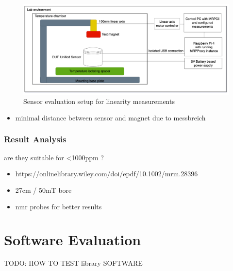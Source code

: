 \begin{figure}
\centering
\includegraphics{./generated_images/border_Sensor_evaluation_setup_for_linearity_measurements.png}
\caption{Sensor evaluation setup for linearity measurements
\label{Sensor_evaluation_setup_for_linearity_measurements.png}}
\end{figure}

\begin{itemize}
\tightlist
\item
  minimal distance between sensor and magnet due to messbreich
\end{itemize}

\hypertarget{result-analysis}{%
\subsubsection{Result Analysis}\label{result-analysis}}

are they suitable for \textless1000ppm ?

\begin{itemize}
\tightlist
\item
  https://onlinelibrary.wiley.com/doi/epdf/10.1002/mrm.28396
\item
  27cm / 50mT bore
\item
  nmr probes for better results
\end{itemize}

\hypertarget{software-evaluation}{%
\section{Software Evaluation}\label{software-evaluation}}

TODO: HOW TO TEST library SOFTWARE


